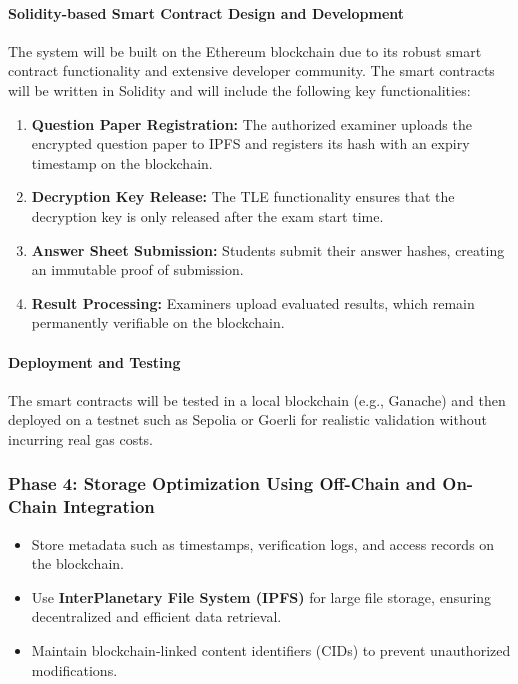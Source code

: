 \documentclass[12pt,a4paper]{article}
\begin{document}
\paragraph{Solidity-based Smart Contract Design and Development}
The system will be built on the Ethereum blockchain due to its robust smart contract functionality and extensive developer community. The smart contracts will be written in Solidity and will include the following key functionalities:
\begin{enumerate}
    \item \textbf{Question Paper Registration:} The authorized examiner uploads the encrypted question paper to IPFS and registers its hash with an expiry timestamp on the blockchain.
    \item \textbf{Decryption Key Release:} The TLE functionality ensures that the decryption key is only released after the exam start time.
    \item \textbf{Answer Sheet Submission:} Students submit their answer hashes, creating an immutable proof of submission.
    \item \textbf{Result Processing:} Examiners upload evaluated results, which remain permanently verifiable on the blockchain.
\end{enumerate}

\paragraph{Deployment and Testing}
The smart contracts will be tested in a local blockchain (e.g., Ganache) and then deployed on a testnet such as Sepolia or Goerli for realistic validation without incurring real gas costs.


\subsubsection{Phase 4: Storage Optimization Using Off-Chain and On-Chain Integration}
\begin{itemize}
    \item Store metadata such as timestamps, verification logs, and access records on the blockchain.
    \item Use \textbf{InterPlanetary File System (IPFS)} for large file storage, ensuring decentralized and efficient data retrieval.
    \item Maintain blockchain-linked content identifiers (CIDs) to prevent unauthorized modifications.
\end{itemize}
\end{document}
